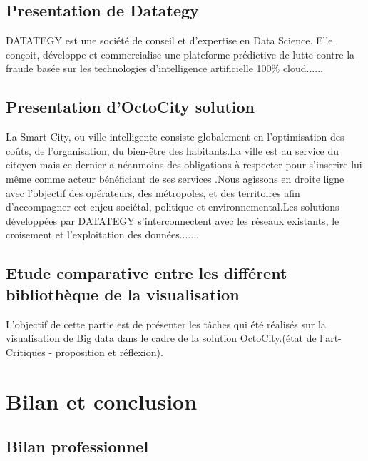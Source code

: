 \documentclass[french, a4paper, 12pt]{report}
\begin{document}
\section{Presentation de Datategy}
DATATEGY est une société de conseil et d’expertise en Data Science. Elle conçoit, développe et commercialise une plateforme prédictive de lutte contre la fraude basée sur les technologies d’intelligence artificielle 100\% cloud......
\section{Presentation d’OctoCity solution}
La Smart City, ou ville intelligente consiste globalement en l’optimisation des coûts, de l’organisation, du bien-être des habitants.La ville est au service du citoyen mais ce dernier a néanmoins des obligations à respecter pour s’inscrire lui même comme acteur bénéficiant de ses services .Nous agissons en droite ligne avec l’objectif des opérateurs, des métropoles, et des territoires afin d’accompagner cet enjeu sociétal, politique et environnemental.Les solutions développées par DATATEGY s’interconnectent avec les réseaux existants, le croisement et l’exploitation des données.......
\section{Etude comparative entre les différent bibliothèque de la visualisation}
L'objectif de cette partie est de présenter les tâches qui été réalisés sur la visualisation de Big data dans le cadre de la solution OctoCity.(état de l’art- Critiques - proposition et réflexion).




\chapter{ Bilan et conclusion}
\section{Bilan professionnel}
\end{document}
